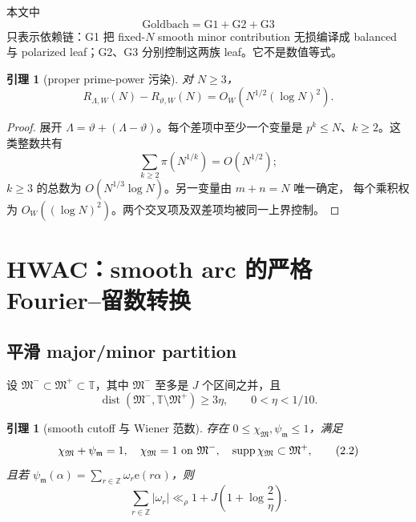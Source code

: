 \documentclass[11pt,a4paper]{ctexart}
\newtheorem{lemma}[theorem]{引理}
\theoremstyle{definition}
\newcommand{\T}{\mathbb T}
\newcommand{\e}{\mathrm e}
\newcommand{\1}{\mathbf 1}
\begin{document}
本文中
\[
\boxed{\text{Goldbach}=\mathrm{G1}+\mathrm{G2}+\mathrm{G3}}
\]
只表示依赖链：G1 把 fixed-$N$ smooth minor contribution 无损编译成
balanced 与 polarized leaf；G2、G3 分别控制这两族 leaf。它不是数值等式。

\begin{lemma}[proper prime-power 污染]
对 $N\ge3$，
\[
R_{\Lambda,W}(N)-R_{\vartheta,W}(N)
=O_W\!\left(N^{1/2}(\log N)^2\right).                  \tag{1.5}
\]
\end{lemma}

\begin{proof}
展开 $\Lambda=\vartheta+(\Lambda-\vartheta)$。每个差项中至少一个变量是
$p^k\le N$、$k\ge2$。这类整数共有
\[
\sum_{k\ge2}\pi(N^{1/k})=O(N^{1/2});
\]
$k\ge3$ 的总数为 $O(N^{1/3}\log N)$。另一变量由 $m+n=N$ 唯一确定，
每个乘积权为 $O_W((\log N)^2)$。两个交叉项及双差项均被同一上界控制。
\end{proof}

\section{HWAC：smooth arc 的严格 Fourier--留数转换}

\subsection{平滑 major/minor partition}

设 $\mathfrak M^-\subset\mathfrak M^+\subset\T$，其中 $\mathfrak M^-$
至多是 $J$ 个区间之并，且
\[
\operatorname{dist}(\mathfrak M^-,\T\setminus\mathfrak M^+)\ge3\eta,
\qquad 0<\eta<1/10.                                    \tag{2.1}
\]

\begin{lemma}[smooth cutoff 与 Wiener 范数]
存在 $0\le\chi_{\mathfrak M},\psi_{\mathfrak m}\le1$，满足
\[
\chi_{\mathfrak M}+\psi_{\mathfrak m}=1,\quad
\chi_{\mathfrak M}=1\ \hbox{on }\mathfrak M^-,\quad
\operatorname{supp}\chi_{\mathfrak M}\subset\mathfrak M^+,             \tag{2.2}
\]
且若
\(
\psi_{\mathfrak m}(\alpha)=\sum_{r\in\mathbb Z}\omega_r\e(r\alpha)
\)，则
\[
\sum_{r\in\mathbb Z}|\omega_r|
\ll_\rho 1+J\left(1+\log\frac2\eta\right).             \tag{2.3}
\]
\end{lemma}
\end{document}
